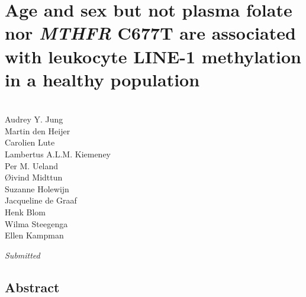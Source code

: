 \chapter{Age and sex but not plasma folate nor \emph{MTHFR} C677T are associated with leukocyte LINE-1 methylation in a healthy population} 
\label{chap3_nbs} 

\quad\\

\noindent
Audrey Y. Jung\\
Martin den Heijer\\
Carolien Lute\\
Lambertus A.L.M. Kiemeney\\
Per M. Ueland\\
{\O}ivind Midttun\\
Suzanne Holewijn\\
Jacqueline de Graaf\\
Henk Blom\\
Wilma Steegenga\\
Ellen Kampman\\

\begin{table}[b]
\emph{Submitted}
\end{table}

\newpage

\section*{Abstract}

